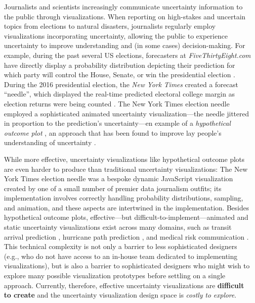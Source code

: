 \documentclass[11pt]{article}
\begin{document}

\noindent Journalists and scientists increasingly communicate uncertainty information to the public through visualizations. When reporting on high-stakes and uncertain topics from elections to natural disasters, journalists regularly employ visualizations incorporating uncertainty, allowing the public to experience uncertainty to improve understanding and (in some cases) decision-making. For example, during the past several US elections, forecasters at \textit{FiveThirtyEight.com} have directly display a probability distribution depicting their prediction for which party will control the House, Senate, or win the presidential election \cite{noauthor_forecasting_nodate}. During the 2016 presidential election, the \textit{New York Times} created a forecast ``needle'', which displayed the real-time predicted electoral college margin as election returns were being counted \cite{gregor_aisch_live_2016}. The New York Times election needle employed a sophisticated animated uncertainty visualization---the needle jittered in proportion to the prediction's uncertainty---en example of a  \emph{hypothetical outcome plot} \cite{hullman2015hops}, an approach that has been found to improve lay people's understanding of uncertainty \cite{hullman2015hops, kale2018hypothetical}.

While more effective, uncertainty visualizations like hypothetical outcome plots are even harder to produce than traditional uncertainty visualizations: The New York Times election needle was a bespoke dynamic JavaScript visualization created by one of a small number of premier data journalism outfits; its implementation involves correctly handling probability distributions, sampling, and animation, and these aspects are intertwined in the implementation. Besides hypothetical outcome plots, effective---but difficult-to-implement---animated and static uncertainty visualizations exist across many domains, such as transit arrival prediction , hurricane path prediction \cite{liu2016hurricane, padilla2017effects, Padilla2015, Cox2013hurricane, Mirzargar2014curve_boxplot}, and medical risk communication \cite{Ancker2006}. This technical complexity is not only a barrier to less sophisticated designers (e.g., who do not have access to an in-house team dedicated to implementing visualizations), but is also a barrier to sophisticated designers who might wish to explore many possible visualization prototypes before settling on a single approach. Currently, therefore, effective uncertainty visualizations are \textbf{difficult to create} and the uncertainty visualization design space is \emph{costly to explore}.
\end{document}
